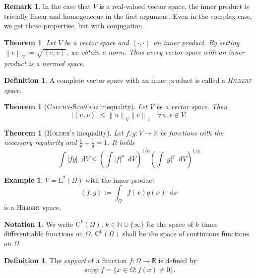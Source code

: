 \documentclass[12pt,a4paper,twoside, open=right]{scrreprt}
\theoremstyle{definition}
\newtheorem{rem}[auf]{Remark}
\newtheorem{defn}[auf]{Definition}
\newtheorem{bsp}[auf]{Example}
\newtheorem{notation}[auf]{Notation}
\theoremstyle{plain}
\newtheorem{sa}[auf]{Theorem}
\DeclareMathOperator{\supp}{supp} %
\newcommand{\abs}[1]{\left\vert #1\right\vert}
\newcommand{\dotp}[2]{\left\langle #1,#2\right\rangle}
\newcommand{\rr}{\mathbb{R}}
\newcommand{\kk}{\mathbb{K}}
\newcommand{\nn}{\mathbb{N}}
\newcommand{\norm}[1]{\left\lVert#1\right\rVert}
\newcommand{\D}{\mathop{}\!\mathrm{d}}
\begin{document}
\begin{rem}
    In the case that $V$ is a real-valued vector space, the inner product is trivially linear and homogeneous in the first argument. Even in the complex case, we get these properties, but with conjugation.
\end{rem}
\begin{sa}
    Let $V$ be a vector space and $\dotp{\cdot}{\cdot}$ an inner product. By setting $\norm{v}_V:=\sqrt{\dotp{v}{v}}$, we obtain a norm. Thus every vector space with an inner product is a normed space.
\end{sa}
\begin{defn}
    A complete vector space with an inner product is called a \emph{\textsc{Hilbert} space}.
\end{defn}
\begin{sa}[\textsc{Cauchy-Schwarz} inequality]
    \label{sa:Schwarz}
    Let $V$ be a vector space. Then 
    \begin{equation}
        \abs{\dotp{u}{v}}\le\norm{u}_V\norm{v}_V\quad \forall u,v\in V.
    \end{equation}
\end{sa}
\begin{sa}[\textsc{Hölder's} inequality]
    \label{sa:hoelder}
    Let $f,g \colon V\to\kk$ be functions with the necessary regularity and $\frac{1}{p}+\frac{1}{q}=1$. It holds
    \begin{equation}
        \int\abs{fg}\D V\le\left(\int\abs{f}^p\D V\right)^{1/p}\left(\int\abs{g}^q\D V\right)^{1/q}
    \end{equation}
\end{sa}
\begin{bsp}
    $V=\mathrm{L}^2(\Omega)$ with the inner product
    \begin{equation}
       \dotp{f}{g}:=\int_\Omega f(x)g(x)\D x
    \end{equation}
    is a \textsc{Hilbert} space.
\end{bsp}
\begin{notation}
    We write $\mathrm{C}^k(\Omega)$, $k\in\nn\cup\{\infty\}$ for the space of $k$ times differentiable functions on $\Omega$. $\mathrm{C}^0(\Omega)$ shall be the space of continuous functions on $\Omega$.
\end{notation}
\begin{defn}
    The \emph{support} of a function $f\colon \Omega\to\rr$ is defined by 
    \begin{equation}
        \supp f = \overline{\{x\in\Omega\colon f(x)\neq 0\}}.
    \end{equation}
\end{defn}
\end{document}

